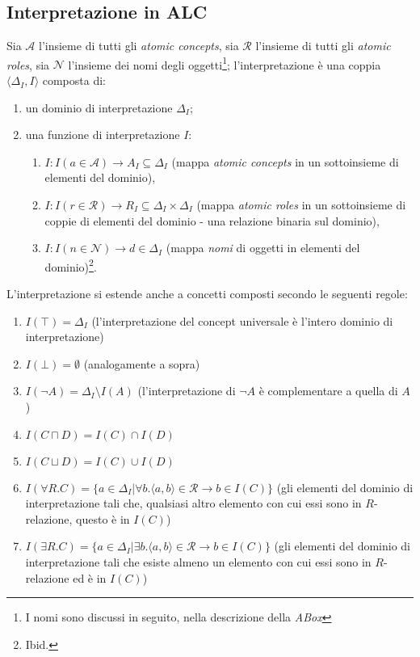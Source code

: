 \subsection{Interpretazione in ALC}
Sia $\mathcal{A}$ l'insieme di tutti gli \textit{atomic concepts}, sia $\mathcal{R}$ l'insieme di tutti gli \textit{atomic roles}, sia $\mathcal{N}$ l'insieme dei nomi degli oggetti\footnote{I nomi sono discussi in seguito, nella descrizione della \textit{ABox}}; l'interpretazione è una coppia $\langle \Delta_I, I \rangle$ composta di:
\begin{enumerate}
\item un dominio di interpretazione $\Delta_I$;
\item una funzione di interpretazione $I$: 
\begin{enumerate}
\item $I: I(a \in \mathcal{A}) \to A_I \subseteq \Delta_I$ (mappa \textit{atomic concepts} in un sottoinsieme di elementi del dominio),
\item $I: I(r \in \mathcal{R}) \to R_I \subseteq \Delta_I \times \Delta_I$ (mappa \textit{atomic roles} in un sottoinsieme di coppie di elementi del dominio - una relazione binaria sul dominio),
\item $I: I(n \in \mathcal{N}) \to d \in \Delta_I$ (mappa \textit{nomi} di oggetti in elementi del dominio)\footnote{Ibid.}.
\end{enumerate}
\end{enumerate}

L'interpretazione si estende anche a concetti composti secondo le seguenti regole:
\begin{enumerate}
\item $I(\top) = \Delta_I$ (l'interpretazione del concept universale è l'intero dominio di interpretazione)
\item $I(\bot) = \emptyset$ (analogamente a sopra)
\item $I(\lnot A) = \Delta_I \setminus I(A)$ (l'interpretazione di $\lnot A$ è complementare a quella di $A$)
\item $I(C \sqcap D) = I(C) \cap I(D)$
\item $I(C \sqcup D) = I(C) \cup I(D)$
\item $I(\forall R. C) = \lbrace a \in \Delta_I | \forall b. \langle a, b \rangle \in \mathcal{R} \to b \in I(C) \rbrace$ (gli elementi del dominio di interpretazione tali che, qualsiasi altro elemento con cui essi sono in $R$-relazione, questo è in $I(C)$)
\item $I(\exists R. C) = \lbrace a \in \Delta_I | \exists b. \langle a, b \rangle \in \mathcal{R} \to b \in I(C) \rbrace$ (gli elementi del dominio di interpretazione tali che esiste almeno un elemento con cui essi sono in $R$-relazione ed è in $I(C)$)
\end{enumerate}

